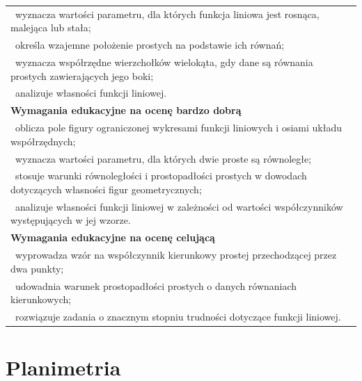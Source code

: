 \documentclass[12pt,a4paper]{article}
\begin{document}
\begin{longtable}{|p{16cm}|}
		\textbullet\ wyznacza wartości parametru, dla których funkcja liniowa jest rosnąca, malejąca lub stała; \\
		
		\textbullet\ określa wzajemne położenie prostych na podstawie ich równań; \\
		
		\textbullet\ wyznacza współrzędne wierzchołków wielokąta, gdy dane są równania prostych zawierających jego boki; \\
		
		\textbullet\ analizuje własności funkcji liniowej. \\ \hline
		
		\textbf{Wymagania edukacyjne na ocenę bardzo dobrą} \\ \hline
		
		\textbullet\ oblicza pole figury ograniczonej wykresami funkcji liniowych i osiami układu współrzędnych; \\
		
		\textbullet\ wyznacza wartości parametru, dla których dwie proste są równoległe; \\
		
		\textbullet\ stosuje warunki równoległości i prostopadłości prostych w dowodach dotyczących własności figur geometrycznych; \\
		
		\textbullet\ analizuje własności funkcji liniowej w zależności od wartości współczynników występujących w jej wzorze. \\ \hline
		
		\textbf{Wymagania edukacyjne na ocenę celującą} \\ \hline
		
		\textbullet\ wyprowadza wzór na współczynnik kierunkowy prostej przechodzącej przez dwa punkty; \\
		
		\textbullet\ udowadnia warunek prostopadłości prostych o danych równaniach kierunkowych; \\
		
		\textbullet\ rozwiązuje zadania o znacznym stopniu trudności dotyczące funkcji liniowej. \\ \hline
		
	\end{longtable}
	
	\section{Planimetria}
	
\end{document}
